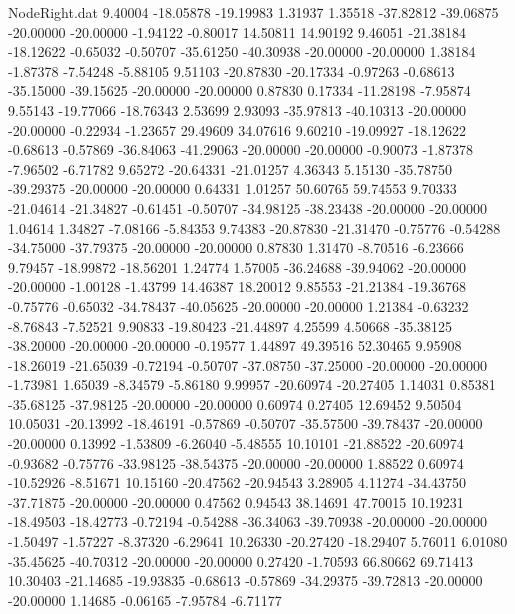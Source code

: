\begin{filecontents}{NodeRight.dat}
   9.40004  -18.05878  -19.19983     1.31937    1.35518  -37.82812  -39.06875  -20.00000  -20.00000   -1.94122   -0.80017   14.50811   14.90192
   9.46051  -21.38184  -18.12622    -0.65032   -0.50707  -35.61250  -40.30938  -20.00000  -20.00000    1.38184   -1.87378   -7.54248   -5.88105
   9.51103  -20.87830  -20.17334    -0.97263   -0.68613  -35.15000  -39.15625  -20.00000  -20.00000    0.87830    0.17334  -11.28198   -7.95874
   9.55143  -19.77066  -18.76343     2.53699    2.93093  -35.97813  -40.10313  -20.00000  -20.00000   -0.22934   -1.23657   29.49609   34.07616
   9.60210  -19.09927  -18.12622    -0.68613   -0.57869  -36.84063  -41.29063  -20.00000  -20.00000   -0.90073   -1.87378   -7.96502   -6.71782
   9.65272  -20.64331  -21.01257     4.36343    5.15130  -35.78750  -39.29375  -20.00000  -20.00000    0.64331    1.01257   50.60765   59.74553
   9.70333  -21.04614  -21.34827    -0.61451   -0.50707  -34.98125  -38.23438  -20.00000  -20.00000    1.04614    1.34827   -7.08166   -5.84353
   9.74383  -20.87830  -21.31470    -0.75776   -0.54288  -34.75000  -37.79375  -20.00000  -20.00000    0.87830    1.31470   -8.70516   -6.23666
   9.79457  -18.99872  -18.56201     1.24774    1.57005  -36.24688  -39.94062  -20.00000  -20.00000   -1.00128   -1.43799   14.46387   18.20012
   9.85553  -21.21384  -19.36768    -0.75776   -0.65032  -34.78437  -40.05625  -20.00000  -20.00000    1.21384   -0.63232   -8.76843   -7.52521
   9.90833  -19.80423  -21.44897     4.25599    4.50668  -35.38125  -38.20000  -20.00000  -20.00000   -0.19577    1.44897   49.39516   52.30465
   9.95908  -18.26019  -21.65039    -0.72194   -0.50707  -37.08750  -37.25000  -20.00000  -20.00000   -1.73981    1.65039   -8.34579   -5.86180
   9.99957  -20.60974  -20.27405     1.14031    0.85381  -35.68125  -37.98125  -20.00000  -20.00000    0.60974    0.27405   12.69452    9.50504
  10.05031  -20.13992  -18.46191    -0.57869   -0.50707  -35.57500  -39.78437  -20.00000  -20.00000    0.13992   -1.53809   -6.26040   -5.48555
  10.10101  -21.88522  -20.60974    -0.93682   -0.75776  -33.98125  -38.54375  -20.00000  -20.00000    1.88522    0.60974  -10.52926   -8.51671
  10.15160  -20.47562  -20.94543     3.28905    4.11274  -34.43750  -37.71875  -20.00000  -20.00000    0.47562    0.94543   38.14691   47.70015
  10.19231  -18.49503  -18.42773    -0.72194   -0.54288  -36.34063  -39.70938  -20.00000  -20.00000   -1.50497   -1.57227   -8.37320   -6.29641
  10.26330  -20.27420  -18.29407     5.76011    6.01080  -35.45625  -40.70312  -20.00000  -20.00000    0.27420   -1.70593   66.80662   69.71413
  10.30403  -21.14685  -19.93835    -0.68613   -0.57869  -34.29375  -39.72813  -20.00000  -20.00000    1.14685   -0.06165   -7.95784   -6.71177

\end{filecontents}
